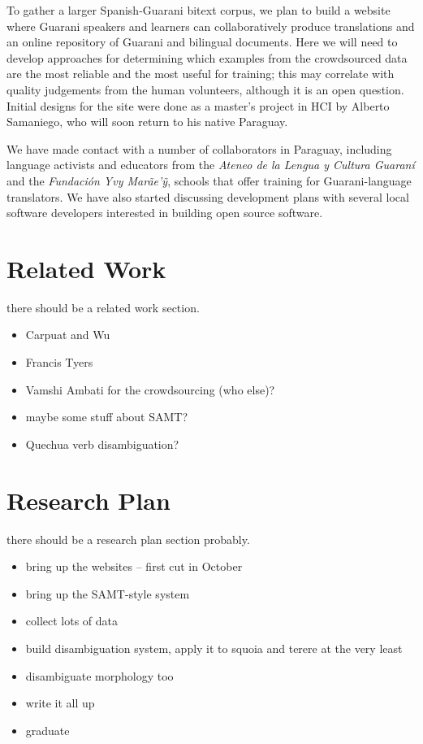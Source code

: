 \documentclass{article}
\begin{document}
To gather a larger Spanish-Guarani bitext corpus, we plan to build a website
where Guarani speakers and learners can collaboratively produce translations
and an online repository of Guarani and bilingual documents.  Here we will need
to develop approaches for determining which examples from the crowdsourced data
are the most reliable and the most useful for training; this may correlate
with quality judgements from the human volunteers, although it is an open
question. Initial designs for the site were done as a master's project in HCI
by Alberto Samaniego, who will soon return to his native Paraguay.

We have made contact with a number of collaborators in Paraguay, including
language activists and educators from the \emph{Ateneo de la Lengua y Cultura
Guaraní} and the \emph{Fundación Yvy Marãe'{\~y}}, schools that offer training
for Guarani-language translators. We have also started discussing development
plans with several local software developers interested in building open source
software.

\section{Related Work}
there should be a related work section.

\cite{carpuat2008evaluation}
\cite{carpuat-wu:2007:EMNLP-CoNLL2007}

\begin{itemize}
  \item Carpuat and Wu
  \item Francis Tyers \cite{tyers-fst}
  \item Vamshi Ambati for the crowdsourcing (who else)?
  \item maybe some stuff about SAMT?
  \item Quechua verb disambiguation?
\end{itemize}

\section{Research Plan}
there should be a research plan section probably.

\begin{itemize}
  \item bring up the websites -- first cut in October
  \item bring up the SAMT-style system
  \item collect lots of data
  \item build disambiguation system, apply it to squoia and terere at the very least
  \item disambiguate morphology too
  \item write it all up
  \item graduate
\end{itemize}
\end{document}
